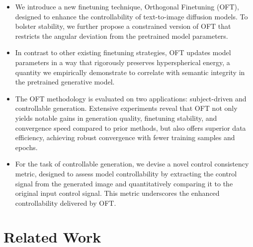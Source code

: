 \begin{itemize}[leftmargin=*,nosep]

    \item We introduce a new finetuning technique, Orthogonal Finetuning (OFT), designed to enhance the controllability of text-to-image diffusion models. To bolster stability, we further propose a constrained version of OFT that restricts the angular deviation from the pretrained model parameters.
    \item In contrast to other existing finetuning strategies, OFT updates model parameters in a way that rigorously preserves hyperspherical energy, a quantity we empirically demonstrate to correlate with semantic integrity in the pretrained generative model.
    \item The OFT methodology is evaluated on two applications: subject-driven and controllable generation. Extensive experiments reveal that OFT not only yields notable gains in generation quality, finetuning stability, and convergence speed compared to prior methods, but also offers superior data efficiency, achieving robust convergence with fewer training samples and epochs.
    \item For the task of controllable generation, we devise a novel control consistency metric, designed to assess model controllability by extracting the control signal from the generated image and quantitatively comparing it to the original input control signal. This metric underscores the enhanced controllability delivered by OFT.
\end{itemize}

\section{Related Work}

